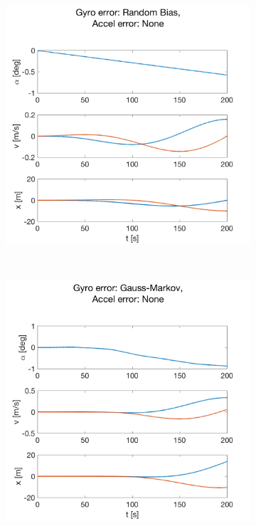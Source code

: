 \documentclass{article}
\begin{document}
\begin{figure}[H]
    \centering
    \begin{subfigure}[t]{0.49\textwidth}
        \centering
        \includegraphics[width=\textwidth]{fig/gyro_bc}
    \end{subfigure}
    ~
    \begin{subfigure}[t]{0.49\textwidth}
        \centering
        \includegraphics[width=\textwidth]{fig/gyro_gm}

\end{subfigure}
\end{figure}
\end{document}
